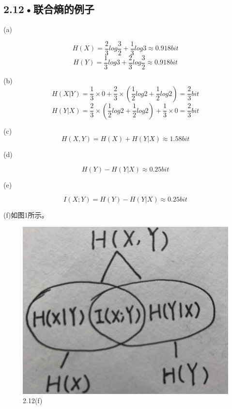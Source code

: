 \documentclass[UTF8]{ctexart}
\begin{document}
\subsection*{2.12•联合熵的例子}

(a)

\begin{displaymath}
H(X)=\frac{2}{3}log\frac{3}{2}+\frac{1}{3}log3\approx 0.918bit
\end{displaymath}
\begin{displaymath}
H(Y)=\frac{1}{3}log3+\frac{2}{3}log\frac{3}{2}\approx 0.918bit
\end{displaymath}

(b)
\begin{displaymath}
H(X|Y)=\frac{1}{3}\times 0 + \frac{2}{3}\times (\frac{1}{2}log2+\frac{1}{2}log2)=\frac{2}{3}bit
\end{displaymath}
\begin{displaymath}
H(Y|X)=\frac{2}{3}\times(\frac{1}{2}log2 + \frac{1}{2}log2)+\frac{1}{3}\times 0 = \frac{2}{3}bit
\end{displaymath}

(c)
\begin{displaymath}
H(X,Y) = H(X)+H(Y|X)\approx 1.58bit
\end{displaymath}

(d)

\begin{displaymath}
H(Y)-H(Y|X)\approx 0.25bit
\end{displaymath}

(e)

\begin{displaymath}
I(X;Y)=H(Y)-H(Y|X)\approx 0.25bit
\end{displaymath}

(f)如图1所示。
\begin{figure}[h]
    \centering
    \includegraphics[totalheight=1.8in]{hw1_1.png}
    \caption{2.12(f)}
    \label{fig:2-12-f}
\end{figure}
\end{document}
